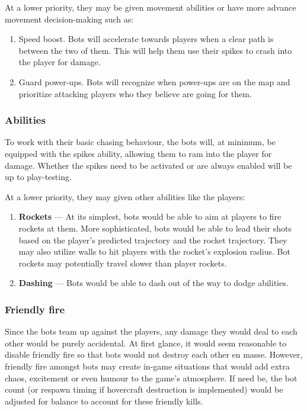\documentclass{article}
\theoremstyle{definition}
\begin{document}
At a lower priority, they may be given movement abilities or have more advance
movement decision-making such as:
\begin{enumerate}
  \item Speed boost. Bots will accelerate towards players when a clear path is
    between the two of them. This will help them use their spikes to crash into
    the player for damage.
  \item Guard power-ups. Bots will recognize when power-ups are on the map and
    prioritize attacking players who they believe are going for them.
\end{enumerate}

\subsubsection{Abilities}

To work with their basic chasing behaviour, the bots will, at minimum, be
equipped with the spikes ability, allowing them to ram into the player for
damage. Whether the spikes need to be activated or are always enabled will be
up to play-testing.

At a lower priority, they may given other abilities like the players:
\begin{enumerate}
  \item \textbf{Rockets} --- At its simplest, bots would be able to aim at
    players to fire rockets at them. More sophisticated, bots would be able to
    lead their shots based on the player's predicted trajectory and the rocket
    trajectory. They may also utilize walls to hit players with the rocket's
    explosion radius. Bot rockets may potentially travel slower than player
    rockets.
  \item \textbf{Dashing} --- Bots would be able to dash out of the way to dodge
    abilities.
\end{enumerate}

\subsubsection{Friendly fire}

Since the bots team up against the players, any damage they would deal to each
other would be purely accidental. At first glance, it would seem reasonable to
disable friendly fire so that bots would not destroy each other en masse.
However, friendly fire amongst bots may create in-game situations that would
add extra chaos, excitement or even humour to the game's atmosphere. If need
be, the bot count (or respawn timing if hovercraft destruction is implemented)
would be adjusted for balance to account for these friendly kills.
\end{document}
